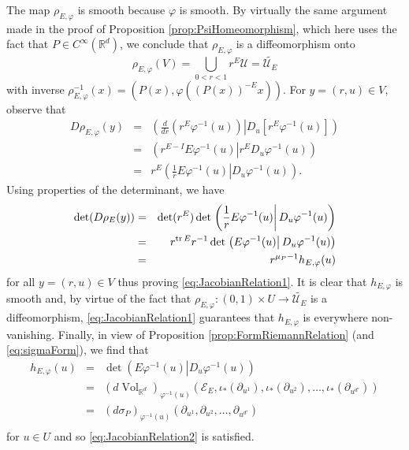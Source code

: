 \documentclass[smallextended]{svjour3}
\theoremstyle{remark}
\renewenvironment{proof}[1][\proofname]{\renewcommand\xproofname{#1}\xproof}{\endxproof}
\renewcommand\det{\operatorname{det}}
\newcommand{\Vol}{\operatorname{Vol}}
\begin{document}
\begin{proof}
The map $\rho_{E,\varphi}$ is smooth because $\varphi$ is smooth. By virtually the same argument made in the proof of Proposition \ref{prop:PsiHomeomorphism}, which here uses the fact that $P\in C^\infty(\mathbb{R}^d)$, we conclude that $\rho_{E,\varphi}$ is a diffeomorphism onto 
\begin{equation*}\rho_{E,\varphi}(V)=\bigcup_{0<r<1}r^E\mathcal{U}=\widetilde{\mathcal{U}_E}
\end{equation*}
with inverse $\rho_{E,\varphi}^{-1}(x)=(P(x),\varphi((P(x))^{-E}x))$. For $y=(r,u)\in V$, observe that
\begin{eqnarray*}
D\rho_{E,\varphi}(y)&=&\left.\left(\frac{d}{dr}(r^E\varphi^{-1}(u)) \right\vert D_u\left[r^E\varphi^{-1}(u)\right]\right)\\
&=&\left.\left(r^{E-I}E\varphi^{-1}(u)\right\vert r^E D_u\varphi^{-1}(u)\right)\\
&=&r^E\left.\left(\frac{1}{r}E\varphi^{-1}(u)\right\vert D_u\varphi^{-1}(u)\right).
\end{eqnarray*}
Using properties of the determinant, we have
\begin{eqnarray*}
    \det(D\rho_E(y))&=&\det(r^E)\det\left.\left(\frac{1}{r}E\varphi^{-1}(u)\right\vert D_u\varphi^{-1}(u)\right)\\
    &=&r^{\tr E}r^{-1}\det\left.\left(E\varphi^{-1}(u)\right\vert D_u\varphi^{-1}(u)\right)\\
    &=&r^{\mu_P-1}h_{E,\varphi}(u)
\end{eqnarray*}
for all $y=(r,u)\in V$ thus proving \eqref{eq:JacobianRelation1}. It is clear that $h_{E,\varphi}$ is smooth and, by virtue of the fact that $\rho_{E,\varphi}:(0,1)\times U\to \widetilde{\mathcal{U}_E}$ is a diffeomorphism, \eqref{eq:JacobianRelation1} guarantees that $h_{E,\varphi}$ is everywhere non-vanishing. Finally, 
in view of Proposition \ref{prop:FormRiemannRelation} (and \eqref{eq:sigmaForm}), we find that
\begin{eqnarray*}
    h_{E,\varphi}(u)&=&
    \det\left.\left(E\varphi^{-1}(u)\right\vert D_u\varphi^{-1}(u)\right)\\ \nonumber
    &=&
    (d\Vol_{\mathbb{R}^d})_{\varphi^{-1}(u)}(\mathcal{E}_E,\iota_*(\partial_{u^1}),\iota_*(\partial_{u^2}),\dots,\iota_*(\partial_{u^{d'}}))\\ \nonumber
    &=&\left(d\sigma_P\right)_{\varphi^{-1}(u)}(\partial_{u^1},\partial_{u^2},\dots,\partial_{u^{d'}})\\
\end{eqnarray*}
for $u\in U$ and so \eqref{eq:JacobianRelation2} is satisfied.
\end{proof}
\end{document}
